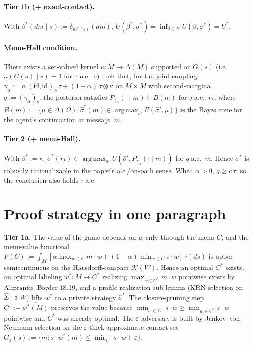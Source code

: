 \documentclass[11pt]{article}
\theoremstyle{definition}
\theoremstyle{remark}
\newcommand{\eps}{\varepsilon}
\newcommand{\Om}{\Omega}
\newcommand{\Si}{\Sigma}
\newcommand{\argmax}{\operatorname*{arg\,max}}
\begin{document}
\paragraph{Tier 1b (+ exact-contact).}
With $\beta^*(dm\mid s) := \delta_{m^*(s)}(dm)$,
$U(\beta^*,\sigma^*) = \inf_{\beta\in B} U(\beta,\sigma^*) = U^*$.

\paragraph{Menu-Hall condition.}
There exists a set-valued kernel $\kappa:M\to\Delta(M)$ supported
on $G(s)$ (i.e.\ $\kappa(G(s)\mid s) = 1$ for $\tau$-a.e.~$s$) such
that, for the joint coupling
$\gamma_\alpha := \alpha\,(\mathrm{id},\mathrm{id})_\#\tau + (1-\alpha)\,\tau\otimes\kappa$
on $M\times M$ with second-marginal $q := (\gamma_\alpha)_2$, the
posterior satisfies $P_{\gamma_\alpha}(\cdot\mid m)\in B(m)$ for
$q$-a.e.~$m$, where
$B(m) := \{\mu\in\Delta(\Om) : \hat\sigma^*(m)\in\argmax_{\hat\sigma'} U(\hat\sigma',\mu)\}$
is the Bayes cone for the agent's continuation at message~$m$.

\paragraph{Tier 2 (+ menu-Hall).}
With $\beta^* := \kappa$,
$\hat\sigma^*(m)\in\argmax_{\hat\sigma'}U(\hat\sigma',P_{\gamma_\alpha}(\cdot\mid m))$
for $q$-a.e.~$m$. Hence $\sigma^*$ is robustly rationalizable in
the paper's a.e./on-path sense. When $\alpha>0$, $q\ge\alpha\tau$,
so the conclusion also holds $\tau$-a.e.

\section{Proof strategy in one paragraph}\label{sec:strategy}

\textbf{Tier 1a.} The value of the game depends on $w$ only through
the menu $C$, and the menu-value functional
$F(C) := \int_M[\alpha\max_{w\in C} m\cdot w + (1-\alpha)\min_{w\in C} s\cdot w]\,\tau(ds)$
is upper semicontinuous on the Hausdorff-compact $\mathcal K(W)$.
Hence an optimal $C^*$ exists, an optimal labeling
$w^*:M\to C^*$ realizing $\max_{w\in C^*} m\cdot w$ pointwise exists
by Aliprantis--Border 18.19, and a profile-realization sub-lemma
(KRN selection on $\hat\Si\twoheadrightarrow W$) lifts $w^*$ to a
private strategy $\hat\sigma^*$. The closure-pruning step
$C^\dagger := \overline{w^*(M)}$ preserves the value because
$\min_{w\in C^\dagger}s\cdot w \ge \min_{w\in C^*}s\cdot w$ pointwise
and $C^*$ was already optimal. The $\eps$-adversary is built by
Jankov--von Neumann selection on the $\eps$-thick approximate
contact set $G_\eps(s) := \{m : s\cdot w^*(m)\le \min_{C^\dagger}s\cdot w + \eps\}$.
\end{document}
